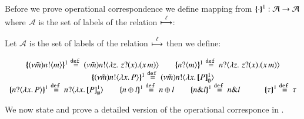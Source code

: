 Before we prove operational correspondence we
define mapping from $\{\!\!\{\cdot\}\!\!\}^{1}: \mathcal{A} \to \mathcal{A}$
where $\mathcal{A}$ is the set of labels of the relation
$\stackrel{\ell}{\longmapsto}$:
\begin{definition}\rm
	Let $\mathcal{A}$ is the set of labels of the relation
	$\stackrel{\ell}{\longmapsto}$ then we define:

\[
	\begin{array}{c}
		\mapa{(\nu \tilde{m})\bactout{n}{m}}^{1}
		\defeq
		(\nu \tilde{m})\bactout{n}{\abs{z}{\,\binp{z}{x} (\appl{x}{m})} }
		\qquad
		\mapa{\bactinp{n}{m}}^{1}
		\defeq
		\bactinp{n}{\abs{z}{\,\binp{z}{x} (\appl{x}{m})} }
		\\
		\mapa{(\nu \tilde{m})\bactout{n}{\abs{{x}}{P}}}^{1}
		\defeq
		(\nu \tilde{m})\bactout{n}{\abs{{x}}{\pmapp{P}{1}{\es}}}
		\\
		\mapa{\bactinp{n}{\abs{{x}}{P}}}^{1}
		\defeq
		\bactinp{n}{\abs{{x}}{\pmapp{P}{1}{\es}}}
		\qquad
		\mapa{\bactsel{n}{l} }^{1} \defeq \bactsel{n}{l} 
		\qquad
		\mapa{\bactbra{n}{l} }^{1} \defeq \bactbra{n}{l} 
		\qquad \quad 
		\mapa{\tau}^{1} \defeq \tau
	\end{array}
\]
\end{definition}

We now state and prove a detailed version of the operational corresponce
in .

